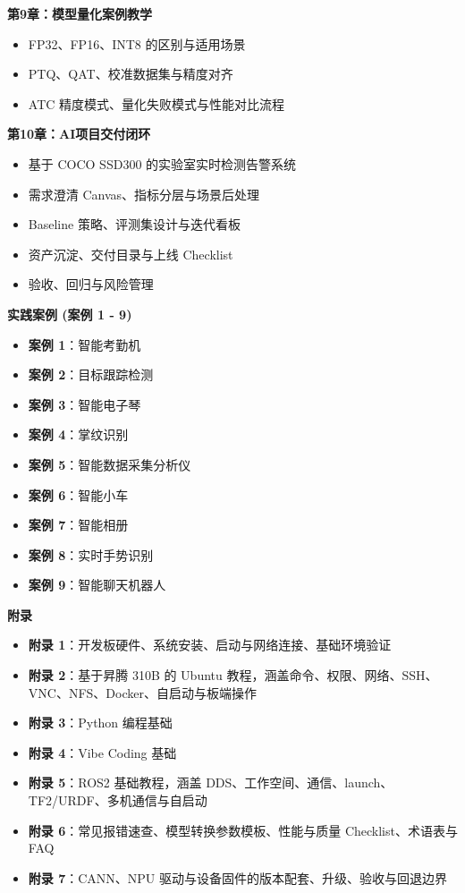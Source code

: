 \textbf{第9章：模型量化案例教学}

\begin{itemize}
\tightlist
\item
  FP32、FP16、INT8 的区别与适用场景
\item
  PTQ、QAT、校准数据集与精度对齐
\item
  ATC 精度模式、量化失败模式与性能对比流程
\end{itemize}

\textbf{第10章：AI项目交付闭环}

\begin{itemize}
\tightlist
\item
  基于 COCO SSD300 的实验室实时检测告警系统
\item
  需求澄清 Canvas、指标分层与场景后处理
\item
  Baseline 策略、评测集设计与迭代看板
\item
  资产沉淀、交付目录与上线 Checklist
\item
  验收、回归与风险管理
\end{itemize}

\textbf{实践案例 (案例 1 - 9)}

\begin{itemize}
\tightlist
\item
  \textbf{案例 1}：智能考勤机
\item
  \textbf{案例 2}：目标跟踪检测
\item
  \textbf{案例 3}：智能电子琴
\item
  \textbf{案例 4}：掌纹识别
\item
  \textbf{案例 5}：智能数据采集分析仪
\item
  \textbf{案例 6}：智能小车
\item
  \textbf{案例 7}：智能相册
\item
  \textbf{案例 8}：实时手势识别
\item
  \textbf{案例 9}：智能聊天机器人
\end{itemize}

\textbf{附录}

\begin{itemize}
\tightlist
\item
  \textbf{附录 1}：开发板硬件、系统安装、启动与网络连接、基础环境验证
\item
  \textbf{附录 2}：基于昇腾 310B 的 Ubuntu
  教程，涵盖命令、权限、网络、SSH、VNC、NFS、Docker、自启动与板端操作
\item
  \textbf{附录 3}：Python 编程基础
\item
  \textbf{附录 4}：Vibe Coding 基础
\item
  \textbf{附录 5}：ROS2 基础教程，涵盖
  DDS、工作空间、通信、launch、TF2/URDF、多机通信与自启动
\item
  \textbf{附录 6}：常见报错速查、模型转换参数模板、性能与质量
  Checklist、术语表与 FAQ
\item
  \textbf{附录 7}：CANN、NPU
  驱动与设备固件的版本配套、升级、验收与回退边界
\end{itemize}

